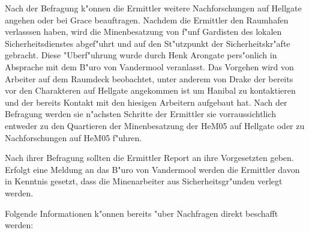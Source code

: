Nach der Befragung k"onnen die Ermittler weitere Nachforschungen auf Hellgate angehen oder bei Grace beauftragen. Nachdem die Ermittler den Raumhafen verlasssen haben, wird die Minenbesatzung von f"unf Gardisten des lokalen Sicherheitsdienstes abgef"uhrt und auf den St"utzpunkt der Sicherheitskr"afte gebracht. Diese "Uberf"uhrung wurde durch Henk Arongate pers"onlich in Absprache mit dem B"uro von Vandermool veranlasst. Das Vorgehen wird von Arbeiter auf dem Raumdeck beobachtet, unter anderem von Drake der bereits vor den Charakteren auf Hellgate angekommen ist um Hanibal zu kontaktieren und der bereits Kontakt mit den hiesigen Arbeitern aufgebaut hat. Nach der Befragung werden sie n"achsten Schritte der Ermittler sie vorraussichtlich entweder zu den Quartieren der Minenbesatzung der HeM05 auf Hellgate oder zu Nachforschungen auf HeM05 f"uhren. 

Nach ihrer Befragung sollten die Ermittler Report an ihre Vorgesetzten geben. Erfolgt eine Meldung an das B"uro von Vandermool werden die Ermittler davon in Kenntnis gesetzt, dass die Minenarbeiter aus Sicherheitsgr"unden verlegt werden.

Folgende Informationen k"onnen bereits "uber Nachfragen direkt beschafft werden:

